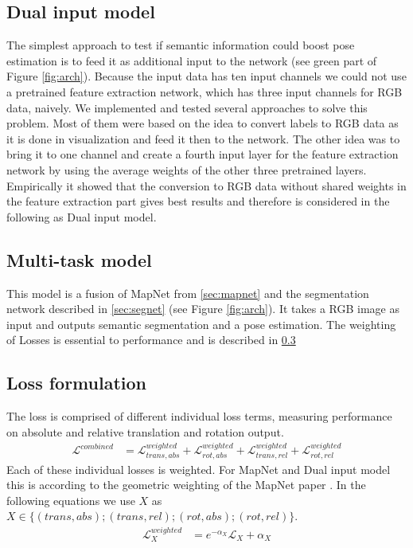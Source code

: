 \documentclass[10pt,twocolumn,letterpaper]{article}
\begin{document}
\subsection{Dual input model}\label{sec:dualinput}
The simplest approach to test if semantic information could boost pose estimation is to feed it as additional input to the network (see green part of Figure \ref{fig:arch}). Because the input data has ten input channels we could not use a pretrained feature extraction network, which has three input channels for RGB data, naively. 
We implemented and tested several approaches to solve this problem. Most of them were based on the idea to convert labels to RGB data as it is done in visualization and feed it then to the network. The other idea was to bring it to one channel and create a fourth input layer for the feature extraction network by using the average weights of the other three pretrained layers. 
Empirically it showed that the conversion to RGB data without shared weights in the feature extraction part gives best results and therefore is considered in the following as Dual input model.
\subsection{Multi-task model}\label{sec:multitask}
This model is a fusion of MapNet from \ref{sec:mapnet} and the segmentation network described in \ref{sec:segnet} (see Figure \ref{fig:arch}). It takes a RGB image as input and outputs semantic segmentation and a pose estimation. The weighting of Losses is essential to performance and is described in \ref{sec:losses}
\subsection{Loss formulation}\label{sec:losses}
The loss is comprised of different individual loss terms, measuring performance on absolute and relative translation and rotation output. 
\begin{align}
\mathcal{L}^{combined} &=\mathcal{L}^{weighted}_{trans,abs}+ \mathcal{L}^{weighted}_{rot,abs}+\mathcal{L}^{weighted}_{trans,rel}+\mathcal{L}^{weighted}_{rot,rel}
\end{align}
Each of these individual losses is weighted. For MapNet and Dual input model this is according to the geometric weighting of the MapNet paper \cite{mapnet2018}.
In the following equations we use $X$ as $X \in \{(trans,abs);(trans,rel);(rot,abs);(rot,rel)\}$.
\begin{align}
\mathcal{L}^{weighted}_X &= e^{-\alpha_X}\mathcal{L}_X +\alpha_X
\end{align}
\end{document}
